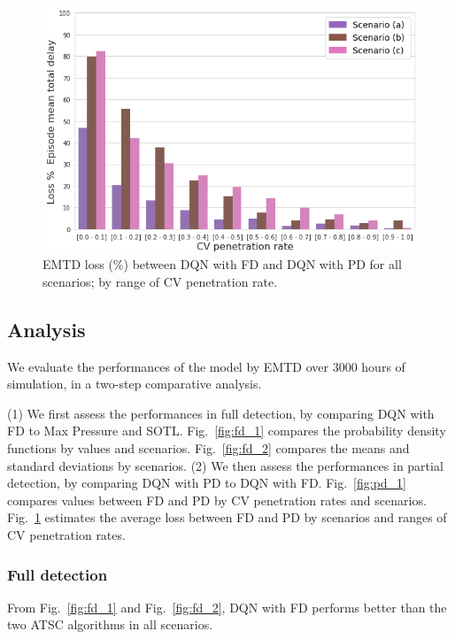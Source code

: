 \documentclass[journal]{IEEEtran}
\begin{document}
\begin{figure}[htbp]
  \begin{center}
    \includegraphics[width=1\linewidth,keepaspectratio]{img/results/pd_2.png}  
    \caption{EMTD loss (\%) between DQN with FD and DQN with PD for all scenarios; by range of CV penetration rate.}
    \label{fig:pd_2}
  \end{center}
\end{figure}

\subsection{Analysis}

We evaluate the performances of the model by EMTD over $3000$ hours of simulation, in a two-step comparative analysis.

(1) We first assess the performances in full detection, by comparing DQN with FD to Max Pressure and SOTL. Fig.~\ref{fig:fd_1} compares the probability density functions by values and scenarios. Fig.~\ref{fig:fd_2} compares the means and standard deviations by scenarios. (2) We then assess the performances in partial detection, by comparing DQN with PD to DQN with FD. 
Fig.~\ref{fig:pd_1} compares values between FD and PD by CV penetration rates and scenarios. Fig.~\ref{fig:pd_2} estimates the average loss between FD and PD by scenarios and ranges of CV penetration rates.

\subsubsection{Full detection}
From Fig.~\ref{fig:fd_1} and Fig.~\ref{fig:fd_2}, DQN with FD performs better than the two ATSC algorithms in all scenarios. 
\end{document}
